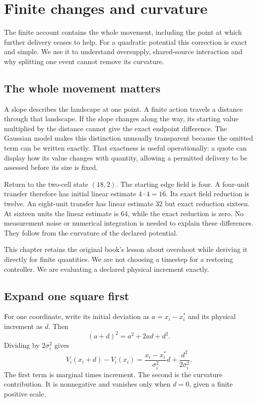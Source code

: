 \chapter{Finite changes and curvature}\label{ch:finite}

The finite account contains the whole movement, including the point at which further delivery ceases to help. For a quadratic potential this correction is exact and simple. We use it to understand oversupply, shared-source interaction and why splitting one event cannot remove its curvature.


\section{The whole movement matters}
A slope describes the landscape at one point. A finite action travels a distance through that landscape. If the slope changes along the way, its starting value multiplied by the distance cannot give the exact endpoint difference. The Gaussian model makes this distinction unusually transparent because the omitted term can be written exactly. That exactness is useful operationally: a quote can display how its value changes with quantity, allowing a permitted delivery to be assessed before its size is fixed.

Return to the two-cell state \((18,2)\). The starting edge field is four. A four-unit transfer therefore has initial linear estimate \(4\cdot4=16\). Its exact field reduction is twelve. An eight-unit transfer has linear estimate 32 but exact reduction sixteen. At sixteen units the linear estimate is 64, while the exact reduction is zero. No measurement noise or numerical integration is needed to explain these differences. They follow from the curvature of the declared potential.

This chapter retains the original book's lesson about overshoot while deriving it directly for finite quantities. We are not choosing a timestep for a restoring controller. We are evaluating a declared physical increment exactly.

\section{Expand one square first}
For one coordinate, write its initial deviation as \(a=x_i-x_i^*\) and its physical increment as \(d\). Then
\begin{equation}
 (a+d)^2=a^2+2ad+d^2.
\end{equation}
Dividing by \(2\sigma_i^2\) gives
\begin{equation}
 V_i(x_i+d)-V_i(x_i)
 =\frac{x_i-x_i^*}{\sigma_i^2}d
  +\frac{d^2}{2\sigma_i^2}.
\end{equation}
The first term is marginal times increment. The second is the curvature contribution. It is nonnegative and vanishes only when \(d=0\), given a finite positive scale.

